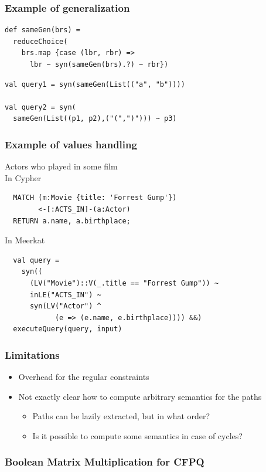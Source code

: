 \documentclass[xcolor=table]{beamer}
\begin{document}
\begin{frame}[fragile] \frametitle{Example of generalization}
  \lstset{language=scala}
\begin{lstlisting}
def sameGen(brs) =
  reduceChoice(
    brs.map {case (lbr, rbr) =>
      lbr ~ syn(sameGen(brs).?) ~ rbr})
\end{lstlisting}
\pause
\begin{lstlisting}
val query1 = syn(sameGen(List(("a", "b"))))

val query2 = syn(
  sameGen(List((p1, p2),("(",")"))) ~ p3)
\end{lstlisting}

\end{frame}

\begin{frame}[fragile] \frametitle{Example of values handling}
  \lstset{language=scala}
  Actors who played in some film
  \\ In Cypher
  \begin{lstlisting}
  MATCH (m:Movie {title: 'Forrest Gump'})
        <-[:ACTS_IN]-(a:Actor)
  RETURN a.name, a.birthplace;
  \end{lstlisting}
  \vspace{0.5cm}
  In Meerkat
  \\
  \begin{lstlisting}
  val query =
    syn((
      (LV("Movie")::V(_.title == "Forrest Gump")) ~
      inLE("ACTS_IN") ~
      syn(LV("Actor") ^
            (e => (e.name, e.birthplace)))) &&)
  executeQuery(query, input)
  \end{lstlisting}

\end{frame}

\begin{frame} \frametitle{Limitations}
\begin{itemize}
  \item Overhead for the regular constraints
  \item Not exactly clear how to compute arbitrary semantics for the paths
  \begin{itemize}
    \item Paths can be lazily extracted, but in what order?
    \item Is it possible to compute some semantics in case of cycles?
  \end{itemize}
\end{itemize}
\end{frame}

\begin{frame} \frametitle{Boolean Matrix Multiplication for CFPQ}
\end{frame}
\end{document}
